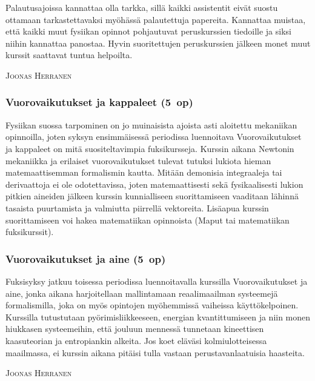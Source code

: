 \documentclass[../ala_hataile.tex]{subfiles}
\begin{document}
	Palautus\-ajoissa kannattaa olla
	tarkka, sillä kaikki assistentit eivät suostu
	ottamaan tarkastettavaksi myöhässä palautettuja papereita. Kannattaa muistaa, että
	kaikki muut fysiikan opinnot pohjautuvat
	peruskurssien tiedoille ja siksi niihin kannattaa
	panostaa. Hyvin suoritettujen perus\-kurssien
	jälkeen monet muut kurssit saattavat
	tuntua helpoilta.
	
	\vspace{0.5cm}
	\noindent\textsc{Joonas Herranen}
	\subsubsection*{Vuorovaikutukset ja kappaleet (5~op)}
	Fysiikan suossa tarpominen on jo muinaisista
	ajoista asti aloitettu mekaniikan
	opinnoilla, joten syksyn ensimmäisessä
	periodissa luennoitava Vuoro\-vaikutukset
	ja kappaleet on mitä suositeltavimpia
	fuksi\-kursseja. Kurssin aikana Newtonin
	mekaniikka ja erilaiset vuorovaikutukset
	tulevat tutuksi lukiota hieman matemaattisemman
	formalismin kautta. Mitään demonisia
	integraaleja tai derivaattoja ei ole
	odotettavissa, joten matemaattisesti sekä
	fysikaalisesti lukion pitkien aineiden jälkeen
	kurssin kunnialliseen suorittamiseen
	vaaditaan lähinnä tasaista puurtamista ja
	valmiutta piirrellä vektoreita. Lisä\-apua
	kurssin suorittamiseen voi hakea matematiikan
	opinnoista (Maput tai
	matematiikan fuksikurssit).
	
	\subsubsection*{Vuorovaikutukset ja aine (5~op)}
	Fuksi\-syksy jatkuu toisessa periodissa
	luennoitavalla kurssilla Vuoro\-vaikutukset
	ja aine, jonka aikana harjoitellaan mallintamaan
	reaali\-maailman systeemejä formalismilla,
	joka on myös opintojen myöhemmissä
	vaiheissa käyttö\-kelpoinen. Kurssilla tutustutaan
	pyörimis\-liikkeeseen, energian kvantittumiseen
	ja niin monen hiukkasen systeemeihin,
	että jouluun mennessä tunnetaan
	kineettisen kaasuteorian ja entropiankin
	alkeita. Jos koet eläväsi kolmi\-ulotteisessa
	maailmassa, ei kurssin aikana pitäisi tulla
	vastaan perustavanlaatuisia haasteita.
	
	\vspace{0.5cm}
	\noindent\textsc{Joonas Herranen}
\end{document}
